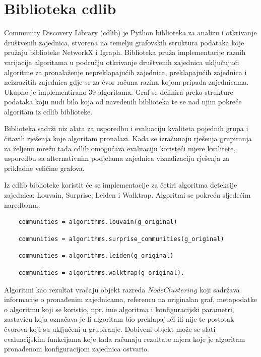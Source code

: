 \pagebreak

\section{Biblioteka cdlib}
Community Discovery Library (cdlib) \cite{rossetti2019cdlib} je Python biblioteka za analizu i otkrivanje društvenih zajednica, stvorena na temelju grafovskih struktura podataka koje pružaju biblioteke NetworkX i Igraph. Biblioteka pruža implementacije raznih varijacija algoritama u području otkrivanje društvenih zajednica uključujući algoritme za pronalaženje nepreklapajućih zajednica, preklapajućih zajednica i neizrazitih zajednica gdje se za čvor računa razina kojom pripada zajednicama. Ukupno je implementirano 39 algoritama. Graf se definira preko strukture podataka koju nudi bilo koja od navedenih biblioteka te se nad njim pokreće algoritam iz cdlib biblioteke.

Biblioteka sadrži niz alata za usporedbu i evaluaciju kvaliteta pojednih grupa i čitavih rješenja koje algoritam pronalazi. Kada se izračunaju rješenja grupiranja za željenu mrežu tada cdlib omogućava evaluaciju koristeći mjere kvalitete, usporedbu sa alternativnim podjelama zajednica vizualizaciju rješenja za prikladne veličine grafova.

Iz cdlib biblioteke koristit će se implementacije za četiri algoritma detekcije zajednica: Louvain, Surprise, Leiden i Walktrap. Algoritmi se pokreću sljedećim naredbama:

\begin{verbatim}
	communities = algorithms.louvain(g_original)
\end{verbatim}


\begin{verbatim}
	communities = algorithms.surprise_communities(g_original)
\end{verbatim}

\begin{verbatim}
	communities = algorithms.leiden(g_original)
\end{verbatim}

\begin{verbatim}
	communities = algorithms.walktrap(g_original).
\end{verbatim}


Algoritmi kao rezultat vraćaju objekt razreda $NodeClustering$ koji sadržava informacije o pronađenim zajednicama, referencu na originalan graf, metapodatke o algoritmu koji se koristio, npr. ime algoritma i konfiguracijski parametri, zastavicu koja označava je li algoritam bio preklapajući ili nije te postotak čvorova koji su uključeni u grupiranje. Dobiveni objekt može se slati evaluacijskim funkcijama koje tada računaju rezultate mjera koje je algoritam pronađenom konfiguracijom zajednica ostvario.


